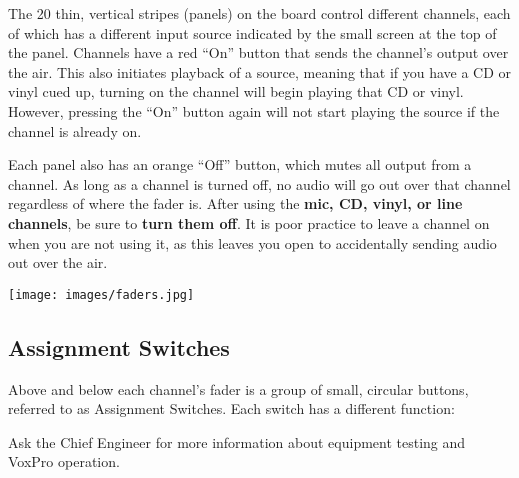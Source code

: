 \documentclass{witrman}
\begin{document}
The 20 thin, vertical stripes (panels) on the board control different channels,
each of which has a different input source indicated by the small screen at the
top of the panel.  Channels have a red ``On'' button that sends the channel's
output over the air.  This also initiates playback of a source, meaning that if
you have a CD or vinyl cued up, turning on the channel will begin playing that
CD or vinyl.  However, pressing the ``On'' button again will not start playing
the source if the channel is already on.

Each panel also has an orange ``Off'' button, which mutes all output from a
channel.  As long as a channel is turned off, no audio will go out over that
channel regardless of where the fader is.  After using the \textbf{mic, CD,
vinyl, or line channels}, be sure to \textbf{turn them off}.  It is poor practice to
leave a channel on when you are not using it, as this leaves you open to
accidentally sending audio out over the air.

\begin{center}
    \texttt{[image: images/faders.jpg]}
\end{center}


\subsection{Assignment Switches}

Above and below each channel's fader is a group of small, circular buttons,
referred to as Assignment Switches.  Each switch has a different function:

\begin{tightitemize}
\end{tightitemize}

Ask the Chief Engineer for more information about equipment testing and VoxPro
operation.

\begin{itemize}



\end{itemize}
\end{document}
